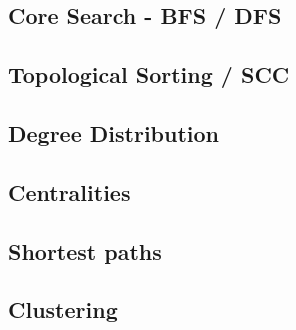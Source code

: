 	\subsection{Core Search - BFS / DFS}
	\label{ssect:bfs_dfs}
	
	\subsection{Topological Sorting / SCC}
	\label{ssect:toposort_scc}
	
	\subsection{Degree Distribution}
	\label{ssect:deg_dist}
	
	\subsection{Centralities}
	\label{ssect:centralities}
	
	\subsection{Shortest paths}
	\label{ssect:shortest_paths}
	
	\subsection{Clustering}
	\label{ssect:clustering}
